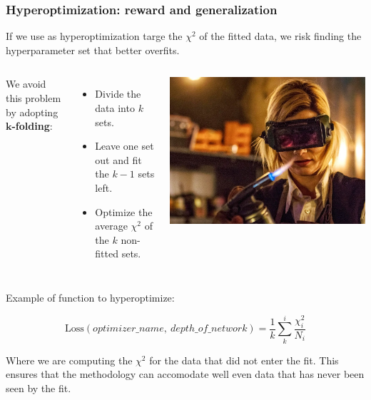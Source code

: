 \begin{frame}
    \frametitle{Hyperoptimization: reward and generalization}
    If we use as hyperoptimization targe the $\chi^{2}$ of the fitted data, we risk finding the hyperparameter set that
    better overfits.


    \vfill

    \begin{columns}
        We avoid this problem by adopting \textbf{$\boldsymbol{k}$-folding}:

        \begin{itemize}
            \item Divide the data into $k$ sets.
            \item Leave one set out and fit the $k-1$ sets left.
            \item Optimize the average $\chi^{2}$ of the $k$ non-fitted sets.
        \end{itemize}
        \includegraphics[width=\textwidth]{juan_future_hyperopt/doctor.jpg}
    \end{columns}

    \vspace{0.4cm}

    Example of function to hyperoptimize:

    \begin{equation*}
        \text{Loss}(optimizer\_name,\ depth\_of\_network) = \frac{1}{k}\displaystyle\sum^{i}_{k} \frac{\chi^{2}_{i}}{N_{i}}
    \end{equation*}

    Where we are computing the $\chi^{2}$ for the data that did not enter the fit. This ensures that the methodology
    can accomodate well even data that has never been seen by the fit.

\end{frame}
